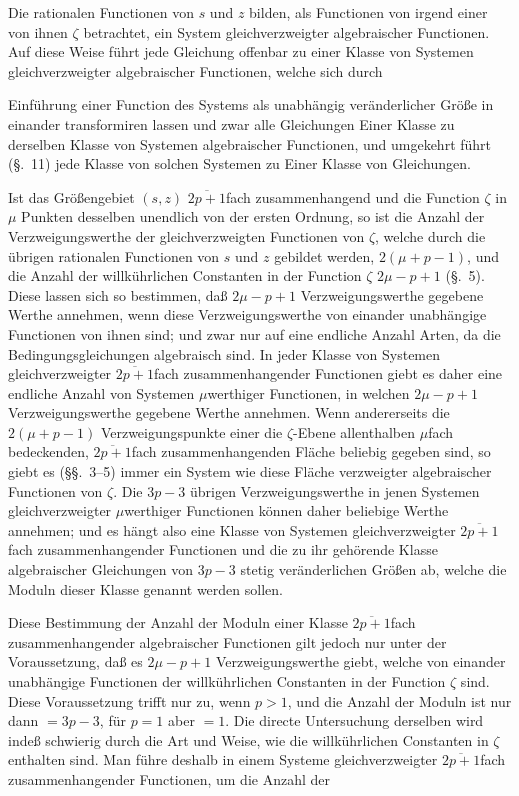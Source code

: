 \documentclass{article}
\begin{document}
Die rationalen Functionen von $s$ und $z$ bilden, als Functionen von irgend einer von ihnen $\zeta$ betrachtet, ein System gleichverzweigter algebraischer Functionen. Auf diese Weise führt jede Gleichung offenbar zu einer Klasse von Systemen gleichverzweigter algebraischer Functionen, welche sich durch

Einführung einer Function des Systems als unabhängig veränderlicher Größe in einander transformiren lassen und zwar alle Gleichungen Einer Klasse zu derselben Klasse von Systemen algebraischer Functionen, und umgekehrt führt (§.~11) jede Klasse von solchen Systemen zu Einer Klasse von Gleichungen.

Ist das Größengebiet $(s, z)$ $\overline{2p+1}$fach zusammenhangend und die Function $\zeta$ in $\mu$ Punkten desselben unendlich von der ersten Ordnung, so ist die Anzahl der Verzweigungswerthe der gleichverzweigten Functionen von $\zeta$, welche durch die übrigen rationalen Functionen von $s$ und $z$ gebildet werden, $2(\mu+p-1)$, und die Anzahl der willkührlichen Constanten in der Function $\zeta$ $2\mu-p+1$ (§.~5). Diese lassen sich so bestimmen, daß $2\mu-p+1$ Verzweigungswerthe gegebene Werthe annehmen, wenn diese Verzweigungswerthe von einander unabhängige Functionen von ihnen sind; und zwar nur auf eine endliche Anzahl Arten, da die Bedingungsgleichungen algebraisch sind. In jeder Klasse von Systemen gleichverzweigter $\overline{2p+1}$fach zusammenhangender Functionen giebt es daher eine endliche Anzahl von Systemen $\mu$werthiger Functionen, in welchen $2\mu-p+1$ Verzweigungswerthe gegebene Werthe annehmen. Wenn andererseits die $2(\mu+p-1)$ Verzweigungspunkte einer die $\zeta$-Ebene allenthalben $\mu$fach bedeckenden, $\overline{2p+1}$fach zusammenhangenden Fläche beliebig gegeben sind, so giebt es (§§.~3–5) immer ein System wie diese Fläche verzweigter algebraischer Functionen von $\zeta$. Die $3p-3$ übrigen Verzweigungswerthe in jenen Systemen gleichverzweigter $\mu$werthiger Functionen können daher beliebige Werthe annehmen; und es hängt also eine Klasse von Systemen gleichverzweigter $\overline{2p+1}$fach zusammenhangender Functionen und die zu ihr gehörende Klasse algebraischer Gleichungen von $3p-3$ stetig veränderlichen Größen ab, welche die Moduln dieser Klasse genannt werden sollen.

Diese Bestimmung der Anzahl der Moduln einer Klasse $\overline{2p+1}$fach zusammenhangender algebraischer Functionen gilt jedoch nur unter der Voraussetzung, daß es $2\mu-p+1$ Verzweigungswerthe giebt, welche von einander unabhängige Functionen der willkührlichen Constanten in der Function $\zeta$ sind. Diese Voraussetzung trifft nur zu, wenn $p > 1$, und die Anzahl der Moduln ist nur dann $= 3p-3$, für $p = 1$ aber $= 1$. Die directe Untersuchung derselben wird indeß schwierig durch die Art und Weise, wie die willkührlichen Constanten in $\zeta$ enthalten sind. Man führe deshalb in einem Systeme gleichverzweigter $\overline{2p+1}$fach zusammenhangender Functionen, um die Anzahl der
\end{document}
